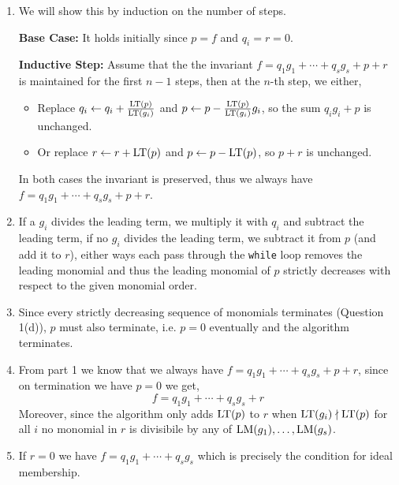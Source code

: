 \documentclass[Notebook.tex]{subfiles}
\begin{document}
\begin{solution}
    \bbni
    \begin{enumerate}
        \item We will show this by induction on the number of steps. 
        
        \textbf{Base Case:} It holds initially since $p = f$ and $q_i = r = 0$. 

        \textbf{Inductive Step:} Assume that the the invariant $f = q_1g_1 + \cdots + q_sg_s + p + r$ is maintained for the first $n-1$ steps, then at the $n$-th step, we either,
        \begin{itemize}
            \item Replace $q_i \leftarrow q_i + \frac{\text{LT}(p)}{\text{LT}(g_i)}$ and $p \leftarrow p - \frac{\text{LT}(p)}{\text{LT}(g_i)}g_i$, so the sum $q_ig_i + p$ is unchanged.
            \item Or replace $r \leftarrow r + \text{LT}(p)$ and $p \leftarrow p - \text{LT}(p)$, so $p + r$ is unchanged.
        \end{itemize}

        In both cases the invariant is preserved, thus we always have $f = q_1g_1 + \cdots + q_sg_s + p + r$.

        \item If a $g_i$ divides the leading term, we multiply it with $q_i$ and subtract the leading term, if no $g_i$ divides the leading term, we subtract it from $p$ (and add it to $r$), either ways each pass through the \texttt{while} loop removes the leading monomial and thus the leading monomial of $p$ strictly decreases with respect to the given monomial order.
        
        \item Since every strictly decreasing sequence of monomials terminates (Question 1(d)), $p$ must also terminate, i.e. $p = 0$ eventually and the algorithm terminates. 
        
        \item From part 1 we know that we always have $f=q_1g_1+\cdots+q_sg_s+p +r$, since on termination we have $p =0$ we get, 
        \[f=q_1g_1+\cdots+q_sg_s+r\]
        Moreover, since the algorithm only adds $\text{LT}(p)$ to $r$ when $\text{LT}(g_i) \nmid \text{LT}(p)$ for all $i$ no monomial in $r$ is divisibile by any of $\text{LM}(g_1),\ldots,\text{LM}(g_s)$. 

        \item If $r=0$ we have $f=q_1g_1+\cdots+q_sg_s$ which is precisely the condition for ideal membership. 
    \end{enumerate}
\end{solution}
\end{document}

